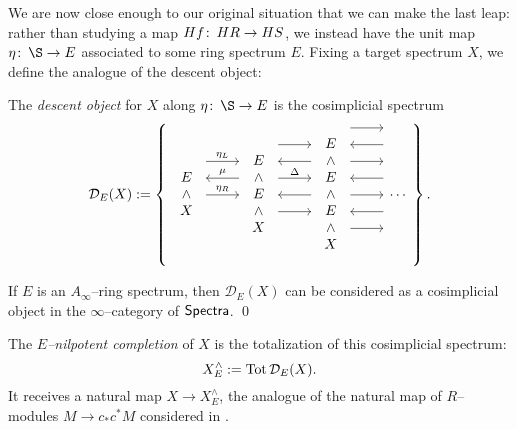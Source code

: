 We are now close enough to our original situation that we can make the last leap: rather than studying a map $Hf\colon\thinspace HR \to HS$, we instead have the unit map $\eta\co \S \to E$ associated to some ring spectrum $E$.  Fixing a target spectrum $X$, we define the analogue of the descent object:
\begin{definition}
The \textit{descent object} for $X$ along $\eta\co \S \to E$ is the cosimplicial spectrum
\[\mathcal{D}_E(X) := \left\{
\begin{tikzcd}
\begin{array}{c} E \\ \sm \\ X \end{array} \arrow[leftarrow, shift left=(\baselineskip)]{r}{\mu} \arrow[shift left=(2*\baselineskip)]{r}{\eta_L} \arrow{r}{\eta_R} &
\begin{array}{c} E \\ \sm \\ E \\ \sm \\ X \end{array} \arrow[shift left=(3*\baselineskip)]{r} \arrow[leftarrow, shift left=(2*\baselineskip)]{r} \arrow[shift left=(\baselineskip)]{r}{\Delta} \arrow[leftarrow]{r} \arrow[shift right=(\baselineskip)]{r} &
\begin{array}{c} E \\ \sm \\ E \\ \sm \\ E \\ \sm \\ X \end{array} \arrow[shift left=(4*\baselineskip)]{r} \arrow[leftarrow, shift left=(3*\baselineskip)]{r} \arrow[shift left=(2*\baselineskip)]{r} \arrow[leftarrow, shift left=(\baselineskip)]{r} \arrow{r} \arrow[leftarrow, shift right=(\baselineskip)]{r} \arrow[shift right=(2*\baselineskip)]{r} &
\cdots
\end{tikzcd}
\right\}.\]
\end{definition}

\begin{lemma}
If $E$ is an $A_\infty$--ring spectrum, then $\mathcal D_E(X)$ can be considered as a cosimplicial object in the $\infty$--category of $\mathsf{Spectra}$. \qed
\end{lemma}

\begin{definition}\label{DefnOfNilpCompletionAndASS}
The \textit{$E$--nilpotent completion} of $X$ is the totalization of this cosimplicial spectrum: \[X^\wedge_E := \operatorname{Tot} \mathcal D_E(X).\]  It receives a natural map $X \to X^\wedge_E$, the analogue of the natural map of $R$--modules $M \to c_* c^* M$ considered in .
\end{definition}

